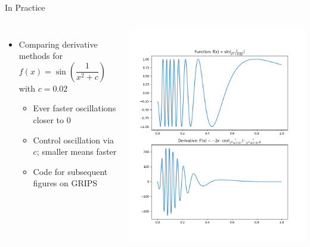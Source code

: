 \begin{frame}[fragile]{In Practice}
%
\begin{columns}
\begin{itemize}
\item Comparing derivative methods for $f(x) = \sin(\dfrac{1}{x^2 + c})$ with $c = 0.02$
	\begin{itemize}
	\item Ever faster oscillations closer to 0
	\item Control oscillation via $c$; smaller means faster
	\item Code for subsequent figures on GRIPS
	\end{itemize}
\end{itemize}
%
\includegraphics[width=\linewidth]{./gfx/06-derivative-functions}
\end{columns}
%
\end{frame}


